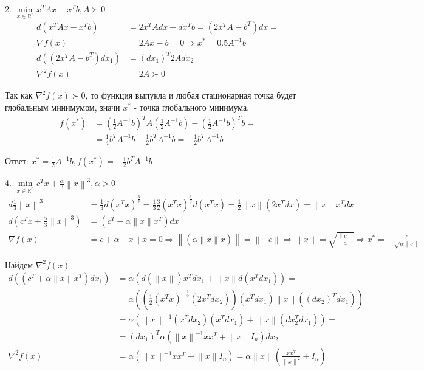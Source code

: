 \documentclass{article}
\newcommand{\RV}[1] {\mathbb{R}^{#1}}
\newcommand{\norm}[1]{\left\lVert#1\right\rVert}
\begin{document}
    2. $\min\limits_{x \in \RV{n}} x^TAx - x^Tb, A \succ 0$
    \begin{align*}
       d(x^TAx - x^Tb) &= 2x^TAdx - dx^Tb = (2x^TA - b^T)dx =\\
       \nabla f(x) &= 2Ax - b = 0 \Rightarrow x^* = 0.5A^{-1}b\\
       d((2x^TA - b^T)dx_1) &= (dx_1)^T2Adx_2\\
       \nabla^2 f(x) &= 2A \succ 0
    \end{align*}
    
    Так как $\nabla^2 f(x) \succ 0$, то функция выпукла и любая стационарная точка будет глобальным минимумом, значи $x^*$ - точка глобального минимума.
    \begin{align*}
       f(x^*) &= (\frac{1}{2}A^{-1}b)^TA(\frac{1}{2}A^{-1}b) - (\frac{1}{2}A^{-1}b)^Tb =\\
       &=\frac{1}{4}b^TA^{-1}b - \frac{1}{2}b^TA^{-1}b = -\frac{1}{2}b^TA^{-1}b
    \end{align*}
    
    Ответ: $x^* = \frac{1}{2}A^{-1}b, f(x^*) = -\frac{1}{2}b^TA^{-1}b$
    \bigbreak
    
    4. $\min\limits_{x \in \RV{n}} c^Tx + \frac{\alpha}{3}\norm{x}^3, \alpha > 0$
    \begin{align*}
       d \frac{1}{3}\norm{x}^3 &= \frac{1}{3}d(x^Tx)^{\frac{3}{2}} = 
       \frac{1}{3}\frac{3}{2}(x^Tx)^{\frac{1}{2}}d(x^Tx) =
       \frac{1}{2}\norm{x}(2x^Tdx) = \norm{x}x^Tdx\\
       d(c^Tx + \frac{\alpha}{3}\norm{x}^3) &= (c^T + \alpha\norm{x}x^T)dx\\
       \nabla f(x) &= c + \alpha\norm{x}x = 0 \Rightarrow \norm{(\alpha\norm{x}x)} = \norm{-c} \Rightarrow \norm{x} = \sqrt{\frac{\norm{c}}{a}} \Rightarrow
       x^* = -\frac{c}{\sqrt{\alpha\norm{c}}}
    \end{align*}
    
    Найдем $\nabla^2 f(x)$    
    \begin{align*}
       d((c^T + \alpha\norm{x}x^T)dx_1) &=
       \alpha(d(\norm{x})x^Tdx_1 + \norm{x}d(x^Tdx_1)) =\\
       &= \alpha((\frac{1}{2}(x^Tx)^{-\frac{1}{2}}(2x^Tdx_2))(x^Tdx_1) 
       \norm{x}((dx_2)^Tdx_1)) =\\
       &=\alpha(\norm{x}^{-1}(x^Tdx_2)(x^Tdx_1) + \norm{x}(dx_2^Tdx_1)) =\\
       &= (dx_1)^T\alpha(\norm{x}^{-1}xx^T + \norm{x}I_n)dx_2\\
       \nabla^2 f(x) &= \alpha(\norm{x}^{-1}xx^T + \norm{x}I_n) =
       \alpha\norm{x}\left(\frac{xx^T}{\norm{x}^2} + I_n\right)
    \end{align*}
    
\end{document}
